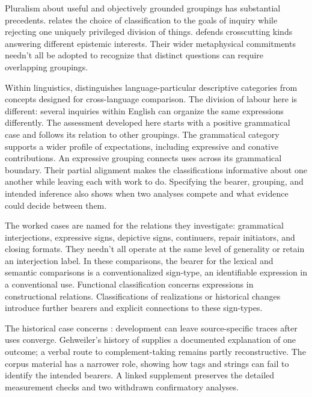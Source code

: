 \documentclass[12pt]{article}
\begin{document}
Pluralism about useful and objectively grounded groupings has substantial
precedents. \textcite[5--7, 17--18]{dupre1993disorder} relates the choice of
classification to the goals of inquiry while rejecting one uniquely
privileged division of things. \textcite[63--64, 69--72]{khalidi2013}
defends crosscutting kinds answering different epistemic interests.
Their wider metaphysical commitments needn't all be adopted to recognize
that distinct questions can require overlapping groupings.

Within linguistics, \textcite[663, 666, 680]{haspelmath2010} distinguishes
language-particular descriptive categories from concepts designed for
cross-language comparison. The division of labour here is different:
several inquiries within English can organize the same expressions
differently. The assessment developed here starts with a positive grammatical
case and follows its relation to other groupings. The grammatical category
supports a wider profile of expectations, including expressive and conative
contributions. An expressive grouping connects uses across its grammatical
boundary. Their partial alignment makes the classifications informative
about one another while leaving each with work to do. Specifying the bearer, grouping, and intended inference also
shows when two analyses compete and what evidence could decide between them.

The worked cases are named for the relations they investigate: grammatical
interjections, expressive signs, depictive signs, continuers, repair
initiators, and closing formats. They needn't all operate at the same level
of generality or retain an interjection label. In these comparisons, the
bearer for the lexical and semantic comparisons is a conventionalized
sign-type, an identifiable expression in a conventional use. Functional
classification concerns expressions in constructional relations. Classifications
of realizations or historical changes introduce further bearers and
explicit connections to these sign-types.

The historical case concerns : development can leave
source-specific traces after uses converge. Gehweiler's history of
 supplies a documented explanation of one outcome; a verbal
route to complement-taking  remains partly reconstructive.
The corpus material has a narrower role, showing how tags and strings
can fail to identify the intended bearers. A linked supplement preserves
the detailed measurement checks and two withdrawn confirmatory analyses.
\end{document}
